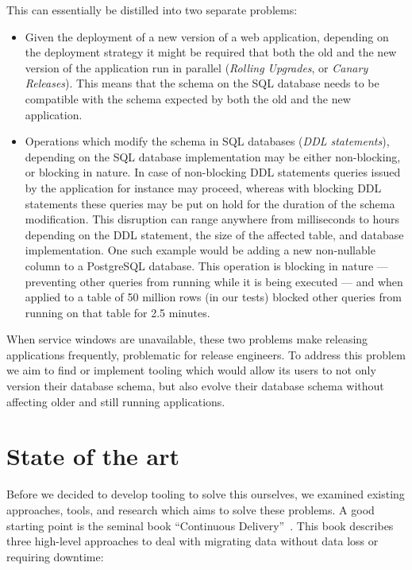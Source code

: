 \documentclass[conference]{IEEEtran}
\begin{document}
This can essentially be distilled into two separate problems:
\begin{itemize}
  \item{Given the deployment of a new version of a web application, depending on the deployment strategy it might be required that both the old and the new version of the application run in parallel (\textit{Rolling Upgrades}, or \textit{Canary Releases}). This means that the schema on the SQL database needs to be compatible with the schema expected by both the old and the new application.}
  \item{Operations which modify the schema in SQL databases (\textit{DDL statements}), depending on the SQL database implementation may be either non-blocking, or blocking in nature. In case of non-blocking DDL statements queries issued by the application for instance may proceed, whereas with blocking DDL statements these queries may be put on hold for the duration of the schema modification. This disruption can range anywhere from milliseconds to hours depending on the DDL statement, the size of the affected table, and database implementation. One such example would be adding a new non-nullable column to a PostgreSQL database. This operation is blocking in nature --- preventing other queries from running while it is being executed --- and when applied to a table of 50 million rows (in our tests) blocked other queries from running on that table for 2.5 minutes.}
\end{itemize}

When service windows are unavailable, these two problems make releasing applications frequently, problematic for release engineers. To address this problem we aim to find or implement tooling which would allow its users to not only version their database schema, but also evolve their database schema without affecting older and still running applications.

\section{State of the art} %


Before we decided to develop tooling to solve this ourselves, we examined existing approaches, tools, and research which aims to solve these problems. A good starting point is the seminal book ``Continuous Delivery''~\cite{Humble:2010:CDR:1869904}. This book describes three high-level approaches to deal with migrating data without data loss or requiring downtime:
\end{document}
